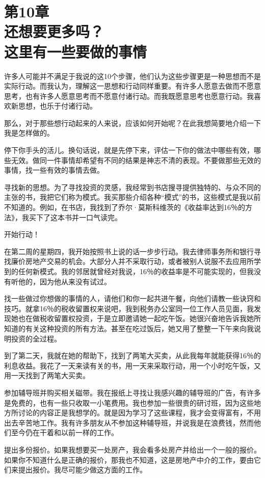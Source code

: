 \section[第10章\q 还想要更多吗？\q 这里有一些要做的事情]{第10章\\还想要更多吗？\\这里有一些要做的事情}

许多人可能并不满足于我说的这10个步骤，他们认为这些步骤更是一种思想而不是实际行动。而我认为，理解这一思想和行动同样重要。有许多人愿意去做而不愿意思考，也有许多人愿意思考而不愿意付诸行动。而我既愿意思考也愿意行动。我喜欢新思想，也乐于付诸行动。

那么，对于那些想行动起来的人来说，应该如何开始呢？在此我想简要地介绍一下我是怎样做的。

停下你手头的活儿。换句话说，就是先停下来，评估一下你的做法中哪些有效，哪些无效。做同一件事情却希望有不同的结果是神志不清的表现。不要做那些无效的事情，找一些有效的事情去做。

寻找新的思想。为了寻找投资的灵感，我经常到书店搜寻提供独特的、与众不同的主张的书，我把它们称为模式。我买那些介绍各种“模式”的书，这些模式是我以前不知道的。例如，在书店，我找到了乔尔·莫斯科维茨的《收益率达到16％的方法》，我买下了这本书并一口气读完。

开始行动！

在第二周的星期四，我开始按照书上说的话一步步行动。我去律师事务所和银行寻找廉价房地产交易的机会。大部分人并不采取行动，或者被别人说服不去应用所学到的任何新模式。我的邻居就曾经对我说，16％的收益率是不可能实现的，但我没有听他的，因为他从来没有试过。

找一些做过你想做的事情的人，请他们和你一起共进午餐，向他们请教一些诀窍和技巧。就拿16％的税收留置权来说吧，我到税务办公室同一位工作人员见面，我发现她也在做税收留置权投资，于是立即邀请她一起吃午饭。她很兴奋地告诉我她所知道的有关这种投资的所有方法。甚至在吃过饭后，她又用了整整一下午来向我说明投资的全过程。

到了第二天，我就在她的帮助下，找到了两笔大买卖，从此我每年就能获得16％的利息收益。我花了一天来读有关的书，用一天来采取行动，用一个小时吃午饭，又用一天找到了两笔大买卖。

参加辅导班并购买相关磁带。我在报纸上寻找让我感兴趣的辅导班的广告，有许多是免费的，也有一些只收取一小笔费用。我也参加一些很贵的研讨班，因为这些地方所讨论的内容正是我想学的。就是因为学习了这些课程，我才会变得富有，不用出去辛苦地工作。我有许多朋友从不参加这种辅导班，并说我是在浪费钱，然而他们至今仍在干着和以前一样的工作。

提出多份报价。如果我想要买一处房产，我会看多处房产并给出一个一般的报价。如果你不知道什么是正确的报价，那我也不知道，这是房地产中介的工作，要由它们来提出报价。我尽可能少做这方面的工作。

